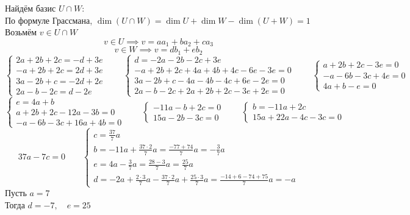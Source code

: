 Найдём базис $ U \cap W $: \\
По формуле Грассмана, $ \dim (U \cap W) = \dim U + \dim W - \dim (U + W) = 1 $ \\
Возьмём $ v \in U \cap W $
$$ v \in U \implies v = aa_1 + ba_2 + ca_3 $$
$$ v \in W \implies v = db_1 + eb_2 $$
$$
\begin{cases}
	2a + 2b + 2c = -d + 3e \\
    -a + 2b + 2c = 2d + 3e \\
    3a - 2b + c = -2d + 2e \\
    2a - b - 2c = d - 2e
\end{cases} \qquad
\begin{cases}
	d = -2a - 2b - 2c + 3e \\
    -a + 2b + 2c + 4a + 4b + 4c - 6e - 3e = 0 \\
    3a - 2b + c - 4a - 4b - 4c + 6e - 2e = 0 \\
    2a - b - 2c + 2a + 2b + 2c - 3e + 2e = 0
\end{cases} \qquad
\begin{cases}
	a + 2b + 2c - 3e = 0 \\
    -a - 6b - 3c + 4e = 0 \\
    4a + b - e = 0
\end{cases} $$
$$
\begin{cases}
	e = 4a + b \\
    a + 2b + 2c - 12a - 3b = 0 \\
    -a - 6b - 3c + 16a + 4b = 0
\end{cases} \qquad
\begin{cases}
	-11a - b + 2c = 0 \\
    15a - 2b - 3c = 0
\end{cases} \qquad
\begin{cases}
	b = -11a + 2c \\
    15a + 22a - 4c - 3c = 0
\end{cases} $$
$$ 37a - 7c = 0 \qquad
\begin{cases}
    c = \frac{37}7a \\
    b = -11a + \frac{37 \cdot 2}7a = \frac{-77 + 74}7a = -\frac37a \\
    e = 4a - \frac37a = \frac{28 - 3}7a = \frac{25}7a \\
    d = -2a + \frac{2 \cdot 3}7a - \frac{37 \cdot 2}7a + \frac{25 \cdot 3}7a = \frac{-14 + 6 - 74 + 75}7a = -a
\end{cases} $$
Пусть $ a = 7 $ \\
Тогда $ d = -7, \quad e = 25 $
